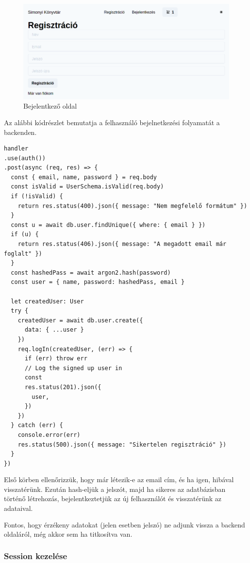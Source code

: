 \begin{figure}[!ht]
  \centering
  \includegraphics[width=150mm, keepaspectratio]{figures/register-screen.png}
  \caption{Bejelentkező oldal}
  \label{fig:RegisterPage}
\end{figure}

Az alábbi kódrészlet bemutatja a felhasználó bejelnetkezési folyamatát a backenden.

\begin{lstlisting}[caption=Felhasználó létrehozása]
handler
.use(auth())
.post(async (req, res) => {
  const { email, name, password } = req.body
  const isValid = UserSchema.isValid(req.body)
  if (!isValid) {
    return res.status(400).json({ message: "Nem megfelelő formátum" })
  }
  const u = await db.user.findUnique({ where: { email } })
  if (u) {
    return res.status(406).json({ message: "A megadott email már foglalt" })
  }
  const hashedPass = await argon2.hash(password)
  const user = { name, password: hashedPass, email }

  let createdUser: User
  try {
    createdUser = await db.user.create({
      data: { ...user }
    })
    req.logIn(createdUser, (err) => {
      if (err) throw err
      // Log the signed up user in
      const
      res.status(201).json({
        user,
      })
    })
  } catch (err) {
    console.error(err)
    res.status(500).json({ message: "Sikertelen regisztráció" })
  }
})
\end{lstlisting}

Első körben ellenőrizzük, hogy már létezik-e az email cím, és ha igen, hibával visszatérünk. Ezután hash-eljük a jelszót, majd
ha sikeres az adatbázisban történő létrehozás, bejelentkeztetjük az új felhasználót és visszatérünk az adataival.

Fontos, hogy érzékeny adatokat (jelen esetben jelszó) ne adjunk vissza a backend oldaláról, még akkor sem ha titkosítva van.

\subsubsection{Session kezelése}

